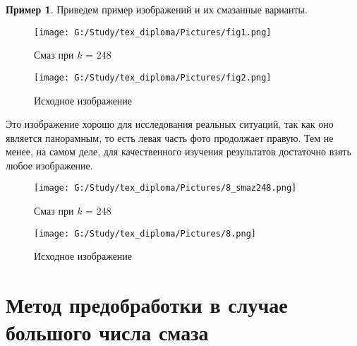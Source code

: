 \documentclass[a4paper]{article}
\theoremstyle{definition}
\newtheorem*{example}{Пример}
\begin{document}
    \begin{example}
    Приведем пример изображений и их смазанные варианты.

\begin{minipage}{70mm}
    \begin{figure}[H]
            \texttt{[image: G:/Study/tex\_diploma/Pictures/fig1.png]}
            \label{Fig1}
            \caption[Смаз при $k$ = 248]{Смаз при $k$ = 248}
        \end{figure}
\end{minipage}
\hfill
\begin{minipage}{70mm}
  \begin{figure}[H]
            \texttt{[image: G:/Study/tex\_diploma/Pictures/fig2.png]}
            \label{Fig2}
            \caption[Исходное изображение]{Исходное изображение}
        \end{figure}
\end{minipage}
\hfill
\vspace*{3mm}


Это изображение хорошо для исследования реальных ситуаций, так как оно является панорамным, то есть левая часть фото продолжает правую. Тем не менее, на самом деле, для качественного изучения результатов достаточно взять любое изображение.


\begin{minipage}{70mm}
    \begin{figure}[H]
            \texttt{[image: G:/Study/tex\_diploma/Pictures/8\_smaz248.png]}
            \label{Fig_8s}
            \caption[Смаз при $k$ = 248]{Смаз при $k$ = 248}
        \end{figure}
\end{minipage}
\hfill
\begin{minipage}{70mm}
  \begin{figure}[H]
            \texttt{[image: G:/Study/tex\_diploma/Pictures/8.png]}
            \label{Fig_8}
            \caption[Исходное изображение]{Исходное изображение}
        \end{figure}
\end{minipage}
\hfill


    \end{example}

    \newpage


    \section{Метод предобработки в случае большого числа смаза}
\end{document}
